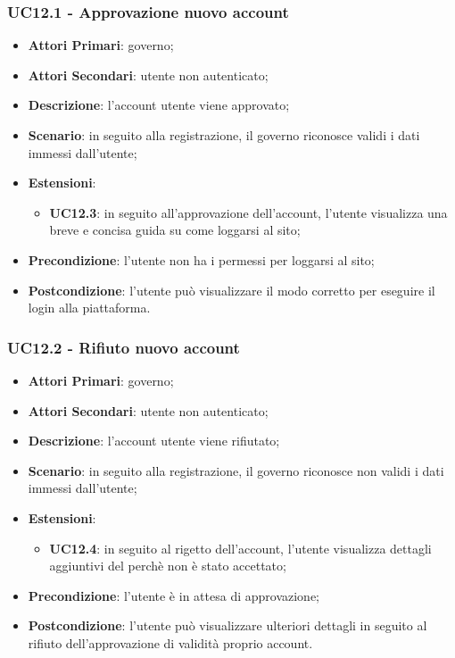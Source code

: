 \subsubsection{UC12.1 - Approvazione nuovo account}
\begin{itemize}
	\item \textbf{Attori Primari}:
	governo;
	\item \textbf{Attori Secondari}:
	utente non autenticato;
	\item \textbf{Descrizione}: l'account utente viene approvato;
	\item \textbf{Scenario}: in seguito alla registrazione, il governo riconosce validi i dati immessi dall'utente;
	\item \textbf{Estensioni}:
	\begin{itemize}
		\item \textbf{UC12.3}: in seguito all'approvazione dell'account, l'utente visualizza una breve e concisa guida su come loggarsi al sito;
	\end{itemize}
	\item \textbf{Precondizione}: l'utente non ha i permessi per loggarsi al sito;
	\item \textbf{Postcondizione}: l'utente può visualizzare il modo corretto per eseguire il login alla piattaforma.
	
\end{itemize}
\subsubsection{UC12.2 - Rifiuto nuovo account}
\begin{itemize}
	\item \textbf{Attori Primari}:
	governo;
	\item \textbf{Attori Secondari}:
	utente non autenticato;
	\item \textbf{Descrizione}: l'account utente viene rifiutato;
	\item \textbf{Scenario}: in seguito alla registrazione, il governo riconosce non validi i dati immessi dall'utente;
	\item \textbf{Estensioni}:
	\begin{itemize}
		\item \textbf{UC12.4}: in seguito al rigetto  dell'account, l'utente visualizza dettagli aggiuntivi del perchè non è stato accettato;
	\end{itemize}
	\item \textbf{Precondizione}: l'utente è in attesa di approvazione;
	\item \textbf{Postcondizione}: l'utente può visualizzare ulteriori dettagli in seguito al rifiuto dell'approvazione di validità proprio account.
	
\end{itemize}
